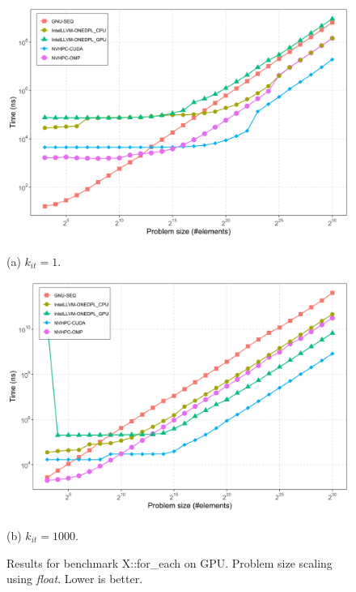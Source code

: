 \documentclass[sigconf]{acmart}
\begin{document}
\begin{figure}[H]
      \centering
      \begin{minipage}[t]{0.48\linewidth}
            \centering
            \includegraphics[width=\linewidth]{figures/gpu_problemSize_time-for_each-k1.png}
            \caption*{(a) $k_{it} = 1$.}
      \end{minipage}
      \hfill
      \begin{minipage}[t]{0.48\linewidth}
            \centering
            \includegraphics[width=\linewidth]{figures/gpu_problemSize_time-for_each-k1000.png}
            \caption*{(b) $k_{it} = 1000$.}
      \end{minipage}
      \caption{Results for benchmark X::for\_each on GPU. Problem size scaling using
            \textit{float}. Lower is better.}
      \label{fig:gpu_problemSize_time-for_each}
\end{figure}
\end{document}
